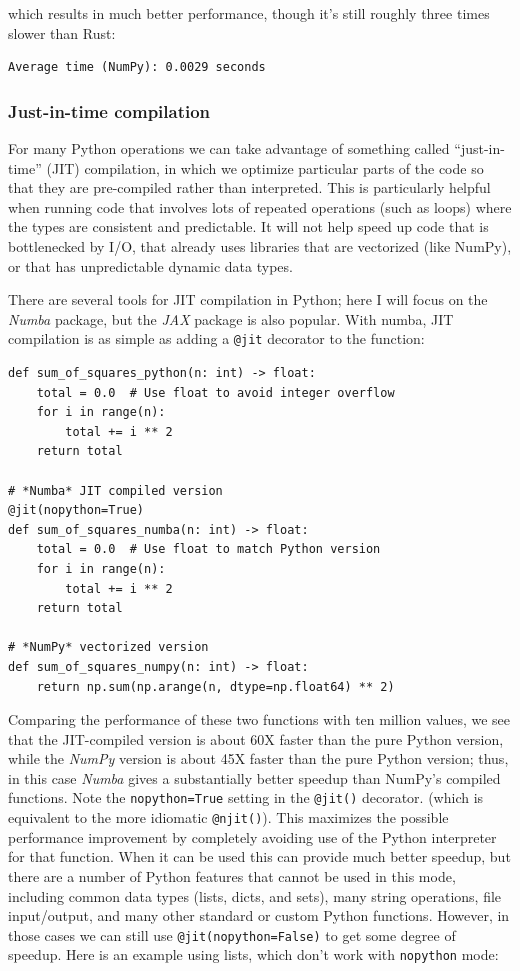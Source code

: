 which results in much better performance, though it's still roughly three times slower than Rust:

\begin{lstlisting}[style=shellshort]
Average time (NumPy): 0.0029 seconds
\end{lstlisting}

\subsubsection{Just-in-time compilation}

For many Python operations we can take advantage of something called ``just-in-time'' (JIT) compilation, in which we optimize particular parts of the code so that they are pre-compiled rather than interpreted.  This is particularly helpful when running code that involves lots of repeated operations (such as loops) where the types are consistent and predictable.  It will not help speed up code that is bottlenecked by I/O, that already uses libraries that are vectorized (like NumPy), or that has unpredictable dynamic data types.

There are several tools for JIT compilation in Python; here I will focus on the \textit{Numba} package, but the \textit{JAX} package is also popular.  With numba, JIT compilation is as simple as adding a \texttt{@jit} decorator to the function:

\begin{lstlisting}[style=Python]
def sum_of_squares_python(n: int) -> float:
    total = 0.0  # Use float to avoid integer overflow
    for i in range(n):
        total += i ** 2
    return total

# *Numba* JIT compiled version
@jit(nopython=True)
def sum_of_squares_numba(n: int) -> float:
    total = 0.0  # Use float to match Python version
    for i in range(n):
        total += i ** 2
    return total

# *NumPy* vectorized version
def sum_of_squares_numpy(n: int) -> float:
    return np.sum(np.arange(n, dtype=np.float64) ** 2)
\end{lstlisting}

Comparing the performance of these two functions with ten million values, we see that the JIT-compiled version is about 60X faster than the pure Python version, while the \textit{NumPy} version is about 45X faster than the pure Python version; thus, in this case \textit{Numba} gives a substantially better speedup than NumPy's compiled functions. Note the \texttt{nopython=True} setting in the \texttt{@jit()} decorator. (which is equivalent to the more idiomatic \texttt{@njit()}).  This maximizes the possible performance improvement by completely avoiding use of the Python interpreter for that function.  When it can be used this can provide much better speedup, but there are a number of Python features that cannot be used in this mode, including common data types (lists, dicts, and sets), many string operations, file input/output, and many other standard or custom Python functions.  However, in those cases we can still use \texttt{@jit(nopython=False)} to get some degree of speedup.  Here is an example using lists, which don't work with \texttt{nopython} mode:

